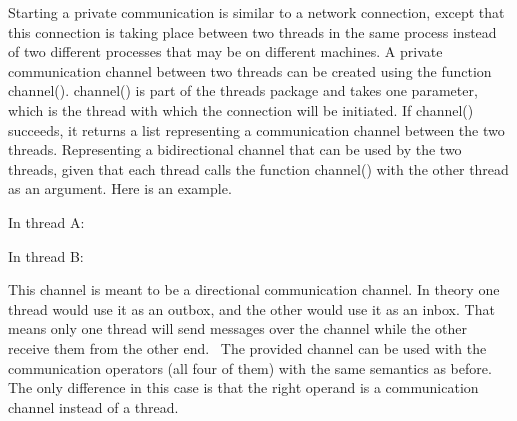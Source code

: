 Starting a private communication is similar to a network connection,
except that this connection is taking place between two threads in the
same process instead of two different processes that may be on
different machines. A private communication channel between two threads
can be created using the function \textsf{channel()}.
\textsf{channel()} is part of the
\textsf{threads} package and takes one parameter, which
is the thread with which the connection will be initiated. If
\textsf{channel()} succeeds, it returns a list representing
a communication channel between the two threads. Representing a
bidirectional channel that can be used by the two threads, given that
each thread calls the function \textsf{channel()} with the
other thread as an argument. Here is an example.

In thread A:


In thread B:


This channel is meant to be a directional communication channel. In
theory one thread would use it as an outbox, and the other would use it
as an inbox. That means only one thread will send messages over the
channel while the other receive them from the other end. \ The provided
channel can be used with the communication operators (all four of them)
with the same semantics as before. The only difference in this case is
that the right operand is a communication channel instead of a thread.



